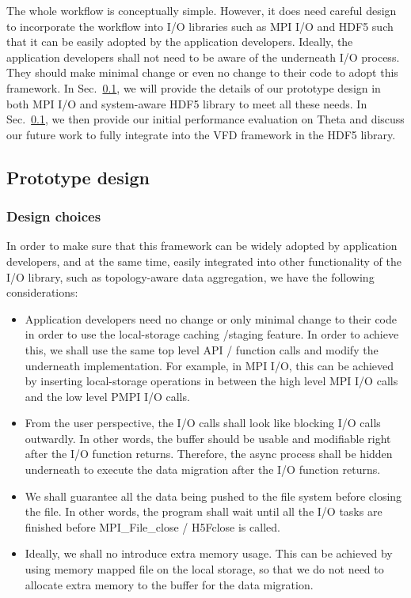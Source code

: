 \documentclass[aps, rmp, 11pt, notitlepage]{revtex4-1}
\begin{document}
The whole workflow is conceptually simple. However, it does need careful design to incorporate the workflow into I/O libraries such as MPI I/O and HDF5 such that it can be easily adopted by the application developers.  Ideally, the application developers shall not need to be aware of the underneath I/O process. They should make minimal change or even no change to their code to adopt this framework. In Sec.~\ref{sec:design}, we will provide the details of our prototype design in both MPI I/O and system-aware HDF5 library to meet all these needs. In Sec.~\ref{sec:design}, we then provide our initial performance evaluation on Theta and discuss our future work to fully integrate into the VFD framework in the HDF5 library. 

\subsection{Prototype design}
\label{sec:design}
\subsubsection{Design choices}
In order to make sure that this framework can be widely adopted by application developers, and at the same time, easily integrated into other functionality of the I/O library, such as topology-aware data aggregation, we have the following considerations: 
\begin{itemize}
\item [(1)] Application developers need no change or only minimal change to their code in order to use the local-storage caching /staging feature. In order to achieve this, we shall use the same top level API / function calls and modify the underneath implementation. For example, in MPI I/O, this can be achieved by inserting local-storage operations in between the high level MPI I/O calls and the low level PMPI I/O calls.

\item [(2)] From the user perspective, the I/O calls shall look like blocking I/O calls outwardly. In other words, the buffer should be usable and modifiable right after the I/O function returns. Therefore, the async process shall be hidden underneath to execute the data migration after the I/O function returns.  

\item [(3)] We shall guarantee all the data being pushed to the file system before closing the file. In other words, the program shall wait until all the I/O tasks are finished before MPI\_File\_close / H5Fclose is called. 

\item [(4)] Ideally, we shall no introduce extra memory usage. This can be achieved by using memory mapped file on the local storage, so that we do not need to allocate extra memory to the buffer for the data migration.
\end{itemize}
\end{document}
